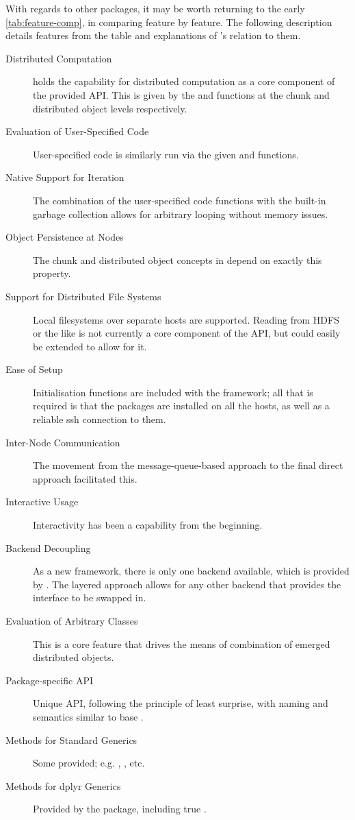 With regards to other packages, it may be worth returning to the early \cref{tab:feature-comp}, in comparing feature by feature.
The following description details features from the table and explanations of \lsr{}'s relation to them.

\begin{description}
\item[Distributed Computation] \lsr{} holds the capability for distributed computation as a core component of the provided API. This is given by the  and  functions at the chunk and distributed object levels respectively.
\item[Evaluation of User-Specified Code] User-specified code is similarly run via the given  and  functions.
\item[Native Support for Iteration] The combination of the user-specified code functions with the built-in garbage collection allows for arbitrary looping without memory issues.
\item[Object Persistence at Nodes] The chunk and distributed object concepts in \lsr{} depend on exactly this property.
\item[Support for Distributed File Systems] Local filesystems over separate hosts are supported. Reading from HDFS or the like is not currently a core component of the API, but could easily be extended to allow for it.
\item[Ease of Setup] Initialisation functions are included with the framework; all that is required is that the \lsr{} packages are installed on all the hosts, as well as a reliable ssh connection to them.
\item[Inter-Node Communication] The movement from the message-queue-based approach to the final direct approach facilitated this.
\item[Interactive Usage] Interactivity has been a capability from the beginning.
\item[Backend Decoupling] As a new framework, there is only one backend available, which is provided by \orcv{}. The layered approach allows for any other backend that provides the \orcv{} interface to be swapped in.
\item[Evaluation of Arbitrary Classes] This is a core feature that drives the means of combination of emerged distributed objects.
\item[Package-specific API] Unique API, following the principle of least surprise, with naming and semantics similar to base \R{}.
\item[Methods for Standard Generics] Some provided; e.g. , , etc.
\item[Methods for dplyr Generics] Provided by the \lso{} package, including true .
\end{description}

